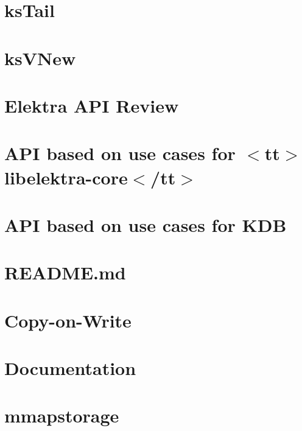 \let\mypdfximage\pdfximage\def\pdfximage{\immediate\mypdfximage}\documentclass[twoside]{book}
\newcommand{\+}{\discretionary{\mbox{\scriptsize$\hookleftarrow$}}{}{}}
\begin{document}
\chapter{ks\+Tail}
\label{doc_contrib_api_reviews_core_ksTail_md}

\chapter{ks\+VNew}
\label{doc_contrib_api_reviews_core_ksVNew_md}

\chapter{Elektra API Review}
\label{doc_contrib_api_reviews_README_md}

\chapter{API based on use cases for $<$tt$>$libelektra-\/core$<$/tt$>$}
\label{doc_contrib_api_usecases_core_md}

\chapter{API based on use cases for KDB}
\label{doc_contrib_api_usecases_kdb_md}

\chapter{README.\+md}
\label{doc_contrib_api_usecases_README_md}

\chapter{Copy-\/on-\/\+Write}
\label{doc_contrib_copy_on_write_md}

\chapter{Documentation}
\label{doc_contrib_documentation_md}

\chapter{mmapstorage}
\label{doc_contrib_mmapstorage_md}

\end{document}
